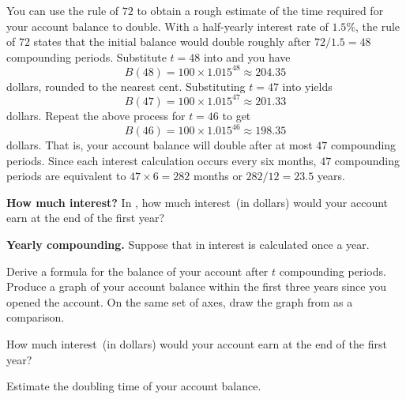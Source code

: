 \documentclass[a4paper,oneside,12pt]{article}
\begin{document}
\begin{solution}
You can use the rule of $72$ to obtain a rough estimate of the time
required for your account balance to double.  With a half-yearly
interest rate of $1.5\%$, the rule of $72$ states that the initial
balance would double roughly after $72 / 1.5 = 48$ compounding
periods.  Substitute $t = 48$ into
 and you have
\[
B(48)
=
100 \times 1.015^{48}
\approx
204.35
\]
dollars, rounded to the nearest cent.  Substituting $t = 47$ into
 yields
\[
B(47)
=
100 \times 1.015^{47}
\approx
201.33
\]
dollars.  Repeat the above process for $t = 46$ to get
\[
B(46)
=
100 \times 1.015^{46}
\approx
198.35
\]
dollars.  That is, your account balance will double after at most
$47$ compounding periods.  Since each interest calculation occurs
every six months, $47$ compounding periods are equivalent to
$47 \times 6 = 282$ months or $282 / 12 = 23.5$ years.
\end{solution}

\begin{exercise}
\textbf{How much interest?}
In , how much interest~(in dollars) would
your account earn at the end of the first year?
\end{exercise}


\begin{exercise}
\label{ex:savings_once_annually}
\textbf{Yearly compounding.}
Suppose that in  interest is calculated
once a year.
\begin{packedenum}
\item\label{subex:savings_1year_formula}
  Derive a formula for the balance of your account after $t$
  compounding periods.  Produce a graph of your account balance within
  the first three years since you opened the account.  On the same set
  of axes, draw the graph from
  as a comparison.

\item\label{subex:savings_1year_interest}
  How much interest~(in dollars) would your account earn at the end of
  the first year?

\item\label{subex:savings_1year_doubling_time}
  Estimate the doubling time of your account balance.
\end{packedenum}
\end{exercise}
\end{document}
